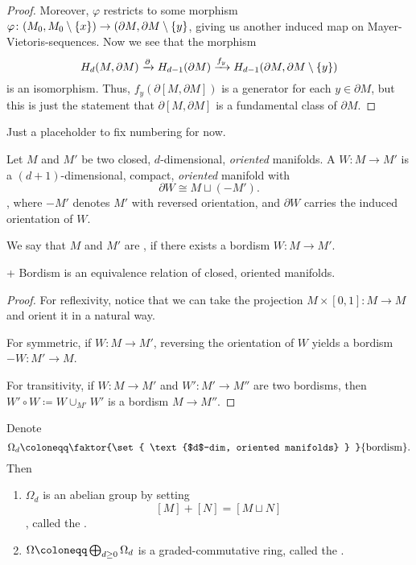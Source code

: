 \begin{proof}
  Moreover, $\varphi $ restricts to some morphism
  $\varphi \colon  (M_0, M_0 \setminus \left\{  x  \right\} )
  \to (\partial M, \partial M \setminus \left\{  y  \right\} $,
  giving us another induced map on Mayer-Vietoris-sequences.
  Now we see that the morphism
  \[
    H_d(M, \partial M) \xrightarrow{\partial }
    H_{d-1}(\partial M)
    \xrightarrow{f_y}
    H_{d-1}(\partial M, \partial M \setminus \left\{  y  \right\} )
  \]
  is an isomorphism.
  Thus, $f_y(\partial [M, \partial M])$ is a generator for each $y\in \partial M$,
  but this is just the statement that $\partial [M, \partial M]$
  is a fundamental class of $\partial M$.
\end{proof}

\begin{editor}
  Just a placeholder to fix numbering for now.
\end{editor}

\begin{definition}[Bordism]
  Let $M$ and $M'$ be two closed, $d$-dimensional,
  \emph{oriented} manifolds.
  A  $W\colon M \to  M'$
  is a $(d+1)$-dimensional, compact, \emph{oriented}
  manifold with
  \[
    \partial W \cong M \sqcup (-M')
  .\],
  where $-M'$ denotes $M'$ with reversed orientation,
  and $\partial W$ carries the induced orientation of $W$.

  We say that $M$ and $M'$ are ,
  if there exists a bordism $W\colon  M \to  M'$.
\end{definition}

\begin{lemma}+
  Bordism is an equivalence relation of closed, oriented manifolds.
\end{lemma}
\begin{proof}
  For reflexivity, notice that we can take
  the projection $M \times [0,1] \colon M \to  M$
  and orient it in a natural way.

  For symmetric, if $W\colon  M \to  M'$,
  reversing the orientation of $W$ yields
  a bordism $-W \colon M' \to  M$.

  For transitivity, if $W\colon M \to  M'$
  and $W' \colon M' \to  M''$ are two bordisms,
  then $W' \circ W \coloneqq W \cup _{M'} W'$
  is a bordism $M \to  M''$.
\end{proof}

\begin{lemma}
  Denote
  \[
    \Omega_d \coloneqq \faktor{\set{ \text{$d$-dim, oriented manifolds} } }{\text{bordism}}
  .\]
  Then
  \begin{enumerate}[h]
    \item $\Omega_d$ is an abelian group by setting
      \[
        [M] + [N] = [M \sqcup N]
      \],
      called the . 
    \item $\Omega \coloneqq  \directsum_{d\geq 0} \Omega_d$
      is a graded-commutative ring, called the
      .
  \end{enumerate}
\end{lemma}

